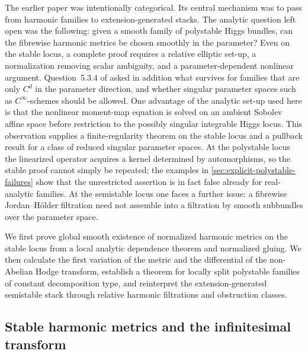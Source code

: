 \documentclass[11pt,reqno]{amsart}
\theoremstyle{definition}
\theoremstyle{remark}
\begin{document}
The earlier paper was intentionally categorical.  Its central mechanism was to pass from harmonic families to extension-generated stacks.  The analytic question left open was the following: given a smooth family of polystable Higgs bundles, can the fibrewise harmonic metrics be chosen smoothly in the parameter?  Even on the stable locus, a complete proof requires a relative elliptic set-up, a normalization removing scalar ambiguity, and a parameter-dependent nonlinear argument.  Question~5.3.4 of \cite{AzamRayan2026} asked in addition what survives for families that are only $C^d$ in the parameter direction, and whether singular parameter spaces such as $C^\infty$-schemes should be allowed.  One advantage of the analytic set-up used here is that the nonlinear moment-map equation is solved on an ambient Sobolev affine space before restriction to the possibly singular integrable Higgs locus.  This observation supplies a finite-regularity theorem on the stable locus and a pullback result for a class of reduced singular parameter spaces.  At the polystable locus the linearized operator acquires a kernel determined by automorphisms, so the stable proof cannot simply be repeated; the examples in \cref{sec:explicit-polystable-failures} show that the unrestricted assertion is in fact false already for real-analytic families.  At the semistable locus one faces a further issue: a fibrewise Jordan--H\"older filtration need not assemble into a filtration by smooth subbundles over the parameter space.

We first prove global smooth existence of normalized harmonic metrics on the stable locus from a local analytic dependence theorem and normalized gluing.  We then calculate the first variation of the metric and the differential of the non-Abelian Hodge transform, establish a theorem for locally split polystable families of constant decomposition type, and reinterpret the extension-generated semistable stack through relative harmonic filtrations and obstruction classes.

\subsection{Stable harmonic metrics and the infinitesimal transform}
\end{document}
